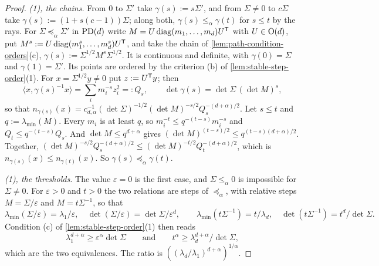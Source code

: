 \begin{proof}
\emph{(1), the chains.} From $0$ to $\Sigma'$ take $\gamma(s) := s\Sigma'$, and from $\Sigma \ne 0$ to
$c\Sigma$ take $\gamma(s) := (1 + s(c-1))\Sigma$; along both, $\gamma(s) \le_\alpha \gamma(t)$ for $s \le t$
by the rays. For $\Sigma \preceq_\alpha \Sigma'$ in $\mathrm{PD}(d)$ write $M = U\operatorname{diag}(m_1, \dots, m_d)U^{\mathsf{T}}$ with
$U \in \mathrm{O}(d)$, put $M^s := U\operatorname{diag}(m_1^s, \dots, m_d^s)U^{\mathsf{T}}$, and take the chain of
\ref{lem:path-condition-orders}(c), $\gamma(s) := \Sigma^{1/2}M^s\Sigma^{1/2}$. It is continuous and
definite, with $\gamma(0) = \Sigma$ and $\gamma(1) = \Sigma'$. Its points are ordered by the criterion (b) of
\ref{lem:stable-step-order}(1). For $x = \Sigma^{1/2}y \ne 0$ put $z := U^{\mathsf{T}}y$; then
\[
  \langle x, \gamma(s)^{-1}x\rangle = \sum_{i} m_i^{-s}z_i^2 =: Q_s , \qquad
  \det\gamma(s) = \det\Sigma\,(\det M)^s ,
\]
so that $n_{\gamma(s)}(x) = c_{d,\alpha}^{-1}(\det\Sigma)^{-1/2}(\det M)^{-s/2}Q_s^{-(d+\alpha)/2}$. Let
$s \le t$ and $q := \lambda_{\min}(M)$. Every $m_i$ is at least $q$, so $m_i^{-t} \le q^{-(t-s)}m_i^{-s}$ and
$Q_t \le q^{-(t-s)}Q_s$. And $\det M \le q^{d+\alpha}$ gives $(\det M)^{(t-s)/2} \le
q^{(t-s)(d+\alpha)/2}$. Together,
$(\det M)^{-s/2}Q_s^{-(d+\alpha)/2} \le (\det M)^{-t/2}Q_t^{-(d+\alpha)/2}$, which is
$n_{\gamma(s)}(x) \le n_{\gamma(t)}(x)$. So $\gamma(s) \preceq_\alpha \gamma(t)$.

\emph{(1), the thresholds.} The value $\varepsilon = 0$ is the first case, and $\Sigma \le_\alpha 0$ is
impossible for $\Sigma \ne 0$. For $\varepsilon > 0$ and $t > 0$ the two relations are steps of
$\preceq_\alpha$, with relative steps $M = \Sigma/\varepsilon$ and $M = t\Sigma^{-1}$, so that
\[
  \lambda_{\min}(\Sigma/\varepsilon) = \lambda_1/\varepsilon , \quad \det(\Sigma/\varepsilon) = \det\Sigma/\varepsilon^d ,
  \qquad
  \lambda_{\min}(t\Sigma^{-1}) = t/\lambda_d , \quad \det(t\Sigma^{-1}) = t^d/\det\Sigma .
\]
Condition (c) of \ref{lem:stable-step-order}(1) then reads
\[
  \lambda_1^{d+\alpha} \ge \varepsilon^\alpha\det\Sigma
  \qquad\text{and}\qquad
  t^\alpha \ge \lambda_d^{d+\alpha}/\det\Sigma ,
\]
which are the two equivalences. The ratio is $((\lambda_d/\lambda_1)^{d+\alpha})^{1/\alpha}$.


\end{proof}
